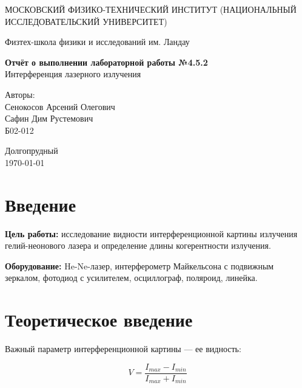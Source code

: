 \documentclass[a4paper,12pt]{article} %
\date{\today}
\begin{document}
\begin{titlepage}
	\begin{center}
		{\large МОСКОВСКИЙ ФИЗИКО-ТЕХНИЧЕСКИЙ ИНСТИТУТ (НАЦИОНАЛЬНЫЙ ИССЛЕДОВАТЕЛЬСКИЙ УНИВЕРСИТЕТ)}
	\end{center}
	\begin{center}
		{\large Физтех-школа физики и исследований им. Ландау}
	\end{center}
	
	
	\vspace{4.5cm}
	{\huge
		\begin{center}
			{\bf Отчёт о выполнении лабораторной работы №4.5.2}\\
			Интерференция лазерного излучения
		\end{center}
	}
	\vspace{2cm}
	\begin{flushright}
		{\LARGE Авторы:\\ Сенокосов Арсений Олегович \\ Сафин Дим Рустемович \\
			\vspace{0.2cm}
			Б02-012}
	\end{flushright}
	\vspace{8cm}
	\begin{center}
		Долгопрудный\\
		\today
	\end{center}
\end{titlepage}

\section{Введение}

\textbf{Цель работы:} исследование видности интерференционной картины излучения гелий-неонового лазера и определение длины когерентности излучения.

\textbf{Оборудование:} He-Ne-лазер, интерферометр Майкельсона с подвижным зеркалом, фотодиод с усилителем, осциллограф, поляроид, линейка.

\section{Теоретическое введение}

Важный параметр интерференционной картины --- ее видность:

\begin{equation}\label{V0}
V = \dfrac{I_{max} - I_{min}}{I_{max} + I_{min}}
\end{equation}
\end{document}

